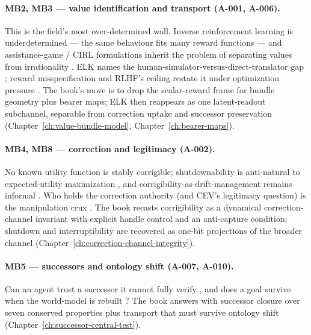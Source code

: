\paragraph{MB2, MB3 --- value identification and transport (A-001, A-006).}
This is the field's most over-determined wall.
Inverse reinforcement learning is underdetermined --- the same behaviour fits many reward functions \autocite{ng2000irl,ziebart2008maxent,komanduru2019irlcomplexity} --- and assistance-game / CIRL formulations inherit the problem of separating values from irrationality \autocite{hadfieldmenell2016,russell2019human}.
ELK names the human-simulator-versus-direct-translator gap \autocite{christiano2021elk}; reward misspecification and RLHF's ceiling restate it under optimization pressure \autocite{amodei2016concrete,casper2023rlhflimits}.
The book's move is to drop the scalar-reward frame for bundle geometry plus bearer maps; ELK then reappears as one latent-readout subchannel, separable from correction uptake and successor preservation (Chapter~\ref{ch:value-bundle-model}, Chapter~\ref{ch:bearer-maps}).

\paragraph{MB4, MB8 --- correction and legitimacy (A-002).}
No known utility function is stably corrigible; shutdownability is anti-natural to expected-utility maximization \autocite{soares2015corrigibility,orseau2016interruptible}, and corrigibility-as-drift-management remains informal \autocite{christiano2018corrigibility}.
Who holds the correction authority (and CEV's legitimacy question) is the manipulation crux \autocite{yudkowsky2004cev}.
The book recasts corrigibility as a dynamical correction-channel invariant with explicit handle control and an anti-capture condition; shutdown and interruptibility are recovered as one-bit projections of the broader channel (Chapter~\ref{ch:correction-channel-integrity}).

\paragraph{MB5 --- successors and ontology shift (A-007, A-010).}
Can an agent trust a successor it cannot fully verify \autocite{yudkowsky2013tiling}, and does a goal survive when the world-model is rebuilt \autocite{deblanc2011ontological}?
The book answers with successor closure over seven conserved properties plus transport that must survive ontology shift (Chapter~\ref{ch:successor-central-test}).

